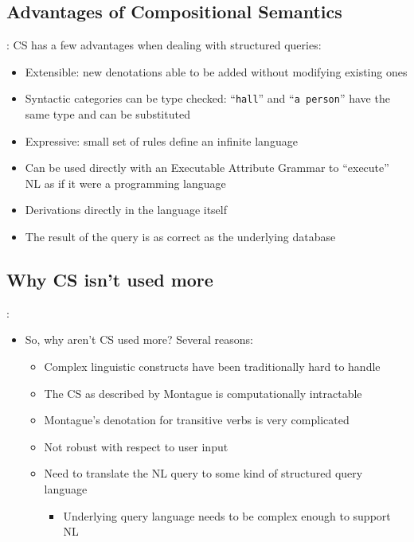 \documentclass[logoontitle,tabu,supertabular,aspectratio=43]{preney-uwindsor-beamer}
\begin{document}
    \subsection{Advantages of Compositional Semantics}
    \begin{frame}{\insertsection: \insertsubsection}
        CS has a few advantages when dealing with structured queries:
        \begin{itemize}
            \item Extensible: new denotations able to be added without modifying existing ones
            \item Syntactic categories can be type checked: ``\texttt{hall}'' and ``\texttt{a person}'' have the same type and can be substituted
            \item Expressive: small set of rules define an infinite language
            \item Can be used directly with an Executable Attribute Grammar \cite{frost1989constructing} to ``execute'' NL as if it were a programming language
            \item Derivations directly in the language itself
            \item The result of the query is as correct as the underlying database
        \end{itemize}
    \end{frame}

    \subsection{Why CS isn't used more}
	\begin{frame}{\insertsection: \insertsubsection}
		\begin{itemize}
			\item So, why aren't CS used more?  Several reasons:
			\begin{itemize}
				\item Complex linguistic constructs have been traditionally hard to handle
				\item The CS as described by Montague is computationally intractable
				\item Montague's denotation for transitive verbs is very complicated
				\item Not robust with respect to user input
				\item Need to translate the NL query to some kind of structured query language \cite{hoffart2013yago2}
				\begin{itemize}
					\item Underlying query language needs to be complex enough to support NL
				\end{itemize}
			\end{itemize}
		\end{itemize}
	\end{frame}
\end{document}
